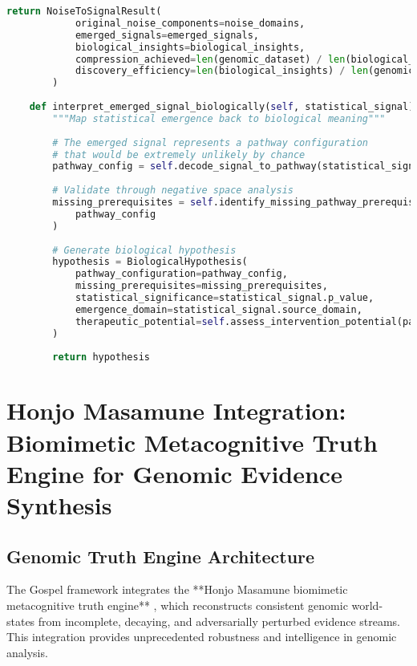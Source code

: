 \documentclass[12pt,a4paper]{article}
\begin{document}
\begin{lstlisting}[language=Python, caption=Practical Genomic Noise-to-Signal Implementation]
        return NoiseToSignalResult(
            original_noise_components=noise_domains,
            emerged_signals=emerged_signals,
            biological_insights=biological_insights,
            compression_achieved=len(genomic_dataset) / len(biological_insights),
            discovery_efficiency=len(biological_insights) / len(genomic_hypotheses)
        )
    
    def interpret_emerged_signal_biologically(self, statistical_signal):
        """Map statistical emergence back to biological meaning"""
        
        # The emerged signal represents a pathway configuration
        # that would be extremely unlikely by chance
        pathway_config = self.decode_signal_to_pathway(statistical_signal)
        
        # Validate through negative space analysis
        missing_prerequisites = self.identify_missing_pathway_prerequisites(
            pathway_config
        )
        
        # Generate biological hypothesis
        hypothesis = BiologicalHypothesis(
            pathway_configuration=pathway_config,
            missing_prerequisites=missing_prerequisites,
            statistical_significance=statistical_signal.p_value,
            emergence_domain=statistical_signal.source_domain,
            therapeutic_potential=self.assess_intervention_potential(pathway_config)
        )
        
        return hypothesis
\end{lstlisting}

\section{Honjo Masamune Integration: Biomimetic Metacognitive Truth Engine for Genomic Evidence Synthesis}

\subsection{Genomic Truth Engine Architecture}

The Gospel framework integrates the **Honjo Masamune biomimetic metacognitive truth engine** \cite{sachikonye2025honjo}, which reconstructs consistent genomic world-states from incomplete, decaying, and adversarially perturbed evidence streams. This integration provides unprecedented robustness and intelligence in genomic analysis.
\end{document}
